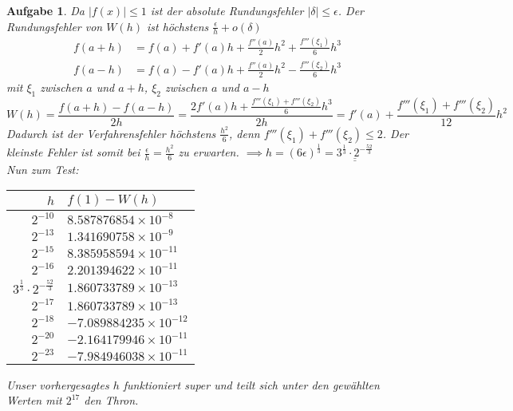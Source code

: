 \documentclass[11pt]{article}
\theoremstyle{break}
\newtheorem{task}{Aufgabe}
\newcommand{\abs}[1]{\ensuremath{\left\vert #1 \right\vert}}
\newcommand{\result}[1]{\ensuremath{\underline{\underline{#1}}}}
\begin{document}
\begin{task}
    Da $\abs{f(x)}\leq 1$ ist der absolute Rundungsfehler $\abs{\delta} \leq \epsilon$.
    Der Rundungsfehler von $W(h)$ ist höchstens $\frac{\epsilon}{h}+o(\delta)$
    \begin{align*}
        f(a + h) &= f(a) + f'(a) h + \frac{f''(a)}{2} h^2 + \frac{f'''(\xi_1)}{6}h^3\\
        f(a - h) &= f(a) - f'(a) h + \frac{f''(a)}{2} h^2 - \frac{f'''(\xi_2)}{6}h^3
    \end{align*}
    mit $\xi_1$ zwischen $a$ und $a+h$, $\xi_2$ zwischen $a$ und $a-h$
        $$W(h) = \frac{f(a+h) - f(a-h)}{2h} = \frac{2f'(a) h + \frac{f'''(\xi_1) + f'''(\xi_2)}{6}h^3}{2h} = f'(a) + \frac{f'''(\xi_1) + f'''(\xi_2)}{12}h^2$$
    Dadurch ist der Verfahrensfehler höchstens $\frac{h^2}{6}$, denn $f'''(\xi_1) + f'''(\xi_2)\leq 2$.
    Der kleinste Fehler ist somit bei $\frac{\epsilon}{h}=\frac{h^2}{6}$ zu erwarten. 
    $\implies h=(6\epsilon)^\frac{1}{3} = \result{3^\frac{1}{3}\cdot 2^{-\frac{52}{3}}}$\vspace{3mm}\\
    Nun zum Test: \\
    \begin{center}
        \begin{tabular}{r|l}
            $h$ & $f(1) - W(h)$\\\hline
            $2^{-10}$ & $8.587876854\times 10^{-8}$\\
            $2^{-13}$ & $1.341690758\times 10^{-9}$\\
            $2^{-15}$ & $8.385958594\times 10^{-11}$\\
            $2^{-16}$ & $2.201394622\times 10^{-11}$\\
            $3^\frac{1}{3}\cdot 2^{-\frac{52}{3}}$ & $1.860733789\times 10^{-13}$\\
            $2^{-17}$ & $1.860733789\times 10^{-13}$\\
            $2^{-18}$ & $-7.089884235\times 10^{-12}$\\
            $2^{-20}$ & $-2.164179946\times 10^{-11}$\\
            $2^{-23}$ & $-7.984946038\times 10^{-11}$
        \end{tabular}
    \end{center}
    Unser vorhergesagtes $h$ funktioniert super und teilt sich unter den gewählten Werten mit $2^{17}$ den Thron.
\end{task}
\end{document}
